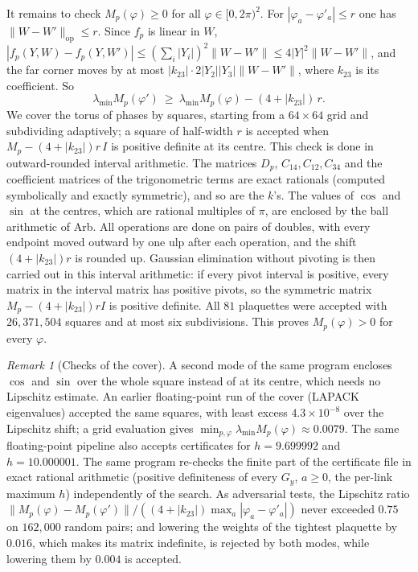 \documentclass[11pt]{amsart}
\theoremstyle{definition}
\theoremstyle{remark}
\newtheorem{remark}[theorem]{Remark}
\begin{document}
It remains to check $M_p(\varphi)\ge0$ for all $\varphi\in[0,2\pi)^2$. For $|\varphi_a-\varphi'_a|\le r$ one has
$\|W-W'\|_{\mathrm{op}}\le r$. Since $f_p$ is linear in $W$,
$|f_p(Y,W)-f_p(Y,W')|\le(\sum_i|Y_i|)^2\|W-W'\|\le4|Y|^2\|W-W'\|$, and the far corner moves by at most
$|k_{23}|\cdot2|Y_2||Y_3|\|W-W'\|$, where $k_{23}$ is its coefficient. So
\[
\lambda_{\min}M_p(\varphi')\ \ge\ \lambda_{\min}M_p(\varphi)-(4+|k_{23}|)\,r .
\]
We cover the torus of phases by squares, starting from a $64\times64$ grid and subdividing adaptively; a square of
half-width $r$ is accepted when $M_p-(4+|k_{23}|)r\,I$ is positive definite at its centre. This check is done in
outward-rounded interval arithmetic. The matrices $D_p$, $C_{14},C_{12},C_{34}$ and the coefficient matrices of the
trigonometric terms are exact rationals (computed symbolically and exactly symmetric), and so are the $k$'s. The
values of $\cos$ and $\sin$ at the centres, which are rational multiples of $\pi$, are enclosed by the ball
arithmetic of Arb. All operations are done on pairs of doubles, with every endpoint moved outward by one ulp after
each operation, and the shift $(4+|k_{23}|)r$ is rounded up. Gaussian elimination without pivoting is then carried
out in this interval arithmetic: if every pivot interval is positive, every matrix in the interval matrix has
positive pivots, so the symmetric matrix $M_p-(4+|k_{23}|)rI$ is positive definite. All $81$ plaquettes were
accepted with $26{,}371{,}504$ squares and at most six subdivisions. This proves $M_p(\varphi)>0$ for every
$\varphi$.

\begin{remark}[Checks of the cover]
A second mode of the same program encloses $\cos$ and $\sin$ over the whole square instead of at its centre, which
needs no Lipschitz estimate. An earlier floating-point run of the cover (LAPACK eigenvalues) accepted the same squares,
with least excess $4.3\times10^{-8}$ over the Lipschitz shift; a grid evaluation gives
$\min_{p,\varphi}\lambda_{\min}M_p(\varphi)\approx0.0079$. The same floating-point pipeline also accepts certificates
for $h=9.699992$ and $h=10.000001$. The same program re-checks the finite part of the certificate file in exact
rational arithmetic (positive definiteness of every $G_y$, $a\ge0$, the per-link maximum $h$) independently of the
search. As adversarial tests, the Lipschitz ratio $\|M_p(\varphi)-M_p(\varphi')\|/((4+|k_{23}|)\max_a|\varphi_a-\varphi'_a|)$
never exceeded $0.75$ on $162{,}000$ random pairs; and lowering the weights of the tightest plaquette by $0.016$, which
makes its matrix indefinite, is rejected by both modes, while lowering them by $0.004$ is accepted.
\end{remark}
\end{document}
